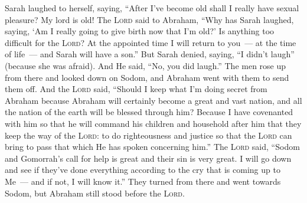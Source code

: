 \begin{inparaenum}
     Sarah laughed to herself, saying, ``After I've become old shall I really have sexual pleasure? My lord is old!%
     The \textsc{Lord} said to Abraham, ``Why has Sarah laughed, saying, `Am I really going to give birth now that I'm old?'%
     Is anything too difficult for the \textsc{Lord}? At the appointed time I will return to you~--- at the time of life~--- and Sarah will have a son.''%
     But Sarah denied, saying, ``I didn't laugh'' (because she was afraid). And He said, ``No, you did laugh.''%
     The men rose up from there and looked down on Sodom, and Abraham went with them to send them off.%
     And the \textsc{Lord} said, ``Should I keep what I'm doing secret from Abraham%
     because Abraham will certainly become a great and vast nation, and all the nation of the earth will be blessed through him?%
     Because I have covenanted with him so that he will command his children and household after him that they keep the way of the \textsc{Lord}: to do righteousness and justice so that the \textsc{Lord} can bring to pass that which He has spoken concerning him.''%
     The \textsc{Lord} said, ``Sodom and Gomorrah's call for help is great and their sin is very great.%
     I will go down and see if they've done everything according to the cry that is coming up to Me~--- and if not, I will know it.''%
     They turned from there and went towards Sodom, but Abraham still stood before the \textsc{Lord}.%

\end{inparaenum}
